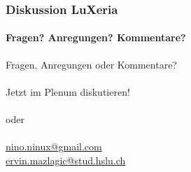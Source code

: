 \begin{frame}\thispagestyle{empty}
	\frametitle{Diskussion \hfill{} \footnotesize{LuXeria}}
	\framesubtitle{Fragen? Anregungen? Kommentare?}
	\begin{center}
	\Large
	Fragen, Anregungen oder Kommentare?\\~\\
	Jetzt im Plenum diskutieren!\\~\\
	oder\\~\\
	\url{nino.ninux@gmail.com}\\
	\url{ervin.mazlagic@stud.hslu.ch}
	\end{center}
\end{frame}
